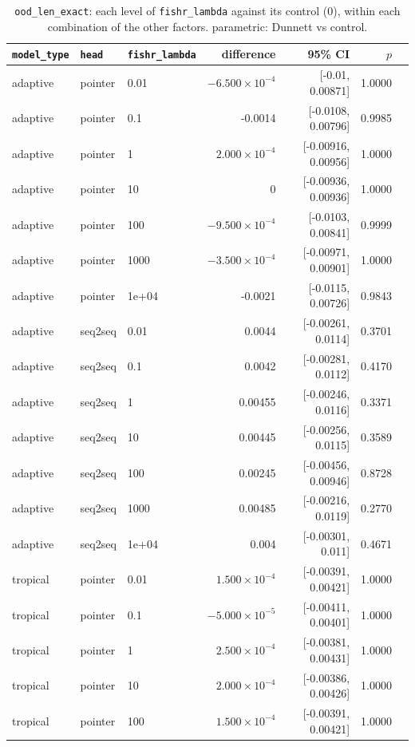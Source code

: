 \documentclass[10pt]{article}
\begin{document}
{\small
\begin{longtable}{lllrrrl}
\caption{\texttt{ood\_len\_exact}: each level of \texttt{fishr\_lambda} against its control (0), within each combination of the other factors. parametric: Dunnett vs control.}\label{tab:control-ood_len_exact}\\
\toprule
\texttt{model\_type} & \texttt{head} & \texttt{fishr\_lambda} & difference & 95\% CI & $p$ & \\
\midrule
\endhead
adaptive & pointer & 0.01 & $-6.500\times10^{-4}$ & [-0.01, 0.00871] & 1.0000 & \\
adaptive & pointer & 0.1 & -0.0014 & [-0.0108, 0.00796] & 0.9985 & \\
adaptive & pointer & 1 & $2.000\times10^{-4}$ & [-0.00916, 0.00956] & 1.0000 & \\
adaptive & pointer & 10 & 0 & [-0.00936, 0.00936] & 1.0000 & \\
adaptive & pointer & 100 & $-9.500\times10^{-4}$ & [-0.0103, 0.00841] & 0.9999 & \\
adaptive & pointer & 1000 & $-3.500\times10^{-4}$ & [-0.00971, 0.00901] & 1.0000 & \\
adaptive & pointer & 1e+04 & -0.0021 & [-0.0115, 0.00726] & 0.9843 & \\
adaptive & seq2seq & 0.01 & 0.0044 & [-0.00261, 0.0114] & 0.3701 & \\
adaptive & seq2seq & 0.1 & 0.0042 & [-0.00281, 0.0112] & 0.4170 & \\
adaptive & seq2seq & 1 & 0.00455 & [-0.00246, 0.0116] & 0.3371 & \\
adaptive & seq2seq & 10 & 0.00445 & [-0.00256, 0.0115] & 0.3589 & \\
adaptive & seq2seq & 100 & 0.00245 & [-0.00456, 0.00946] & 0.8728 & \\
adaptive & seq2seq & 1000 & 0.00485 & [-0.00216, 0.0119] & 0.2770 & \\
adaptive & seq2seq & 1e+04 & 0.004 & [-0.00301, 0.011] & 0.4671 & \\
tropical & pointer & 0.01 & $1.500\times10^{-4}$ & [-0.00391, 0.00421] & 1.0000 & \\
tropical & pointer & 0.1 & $-5.000\times10^{-5}$ & [-0.00411, 0.00401] & 1.0000 & \\
tropical & pointer & 1 & $2.500\times10^{-4}$ & [-0.00381, 0.00431] & 1.0000 & \\
tropical & pointer & 10 & $2.000\times10^{-4}$ & [-0.00386, 0.00426] & 1.0000 & \\
tropical & pointer & 100 & $1.500\times10^{-4}$ & [-0.00391, 0.00421] & 1.0000 & \\

\end{longtable}}
\end{document}
